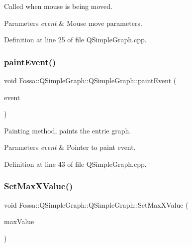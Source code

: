 Called when mouse is being moved. 


\begin{DoxyParams}{Parameters}
{\em event} & Mouse move parameters. \\
\hline
\end{DoxyParams}


Definition at line 25 of file Q\+Simple\+Graph.\+cpp.

\mbox{\label{class_fossa_1_1_q_simple_graph_1_1_q_simple_graph_a6559739099820e1303c1dbe2c5757bc4}} 
\subsubsection{\texorpdfstring{paint\+Event()}{paintEvent()}}
{\footnotesize\ttfamily void Fossa\+::\+Q\+Simple\+Graph\+::\+Q\+Simple\+Graph\+::paint\+Event (\begin{DoxyParamCaption}\item[{Q\+Paint\+Event $\ast$}]{event }\end{DoxyParamCaption})\hspace{0.3cm}{\ttfamily [protected]}}



Painting method, paints the entrie graph. 


\begin{DoxyParams}{Parameters}
{\em event} & Pointer to paint event. \\
\hline
\end{DoxyParams}


Definition at line 43 of file Q\+Simple\+Graph.\+cpp.

\mbox{\label{class_fossa_1_1_q_simple_graph_1_1_q_simple_graph_a568a2dea4e0307b6888aaa048b4da97a}} 
\subsubsection{\texorpdfstring{Set\+Max\+X\+Value()}{SetMaxXValue()}}
{\footnotesize\ttfamily void Fossa\+::\+Q\+Simple\+Graph\+::\+Q\+Simple\+Graph\+::\+Set\+Max\+X\+Value (\begin{DoxyParamCaption}\item[{double}]{max\+Value }\end{DoxyParamCaption})\hspace{0.3cm}{\ttfamily [virtual]}}



